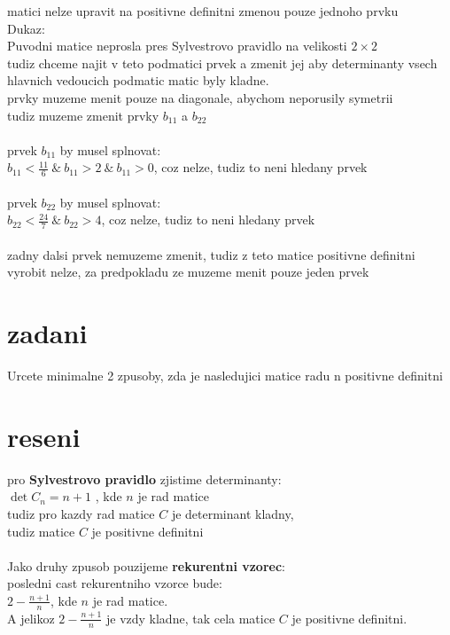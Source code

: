 \documentclass[a4paper]{article}
\begin{document}
matici nelze upravit na positivne definitni zmenou pouze jednoho prvku\\
Dukaz:\\
Puvodni matice neprosla pres Sylvestrovo pravidlo na velikosti $2\times2$\\
tudiz chceme najit v teto podmatici prvek a zmenit jej
aby determinanty vsech hlavnich vedoucich podmatic matic
byly kladne.\\
prvky muzeme menit pouze na diagonale, abychom neporusily symetrii\\
tudiz muzeme zmenit prvky $b_{11}$ a $b_{22}$\\
\\
prvek $b_{11}$ by musel splnovat:\\
$b_{11}<\frac{11}{6} ~\&~ b_{11}>2 ~\&~ b_{11}>0$, coz nelze, tudiz to neni hledany prvek\\
\\
prvek $b_{22}$ by musel splnovat:\\
$b_{22}<\frac{24}{7} ~\&~ b_{22}>4$, coz nelze, tudiz to neni hledany prvek\\
\\
zadny dalsi prvek nemuzeme zmenit, tudiz z teto matice
positivne definitni vyrobit nelze, za predpokladu ze muzeme menit pouze jeden prvek 
 









\section*{zadani}
Urcete minimalne 2 zpusoby, zda je nasledujici matice radu n
positivne definitni

\section*{reseni}
pro \textbf{Sylvestrovo pravidlo} zjistime determinanty:\\
$\det C_n = n+1$ , kde $n$ je rad matice\\
tudiz pro kazdy rad matice $C$ je determinant kladny,\\
tudiz matice $C$ je positivne definitni\\
\\
Jako druhy zpusob pouzijeme \textbf{rekurentni vzorec}:\\
posledni cast rekurentniho vzorce bude:\\
$2-\frac{n+1}{n}$, kde $n$ je rad matice.\\
A jelikoz $2-\frac{n+1}{n}$ je vzdy kladne, tak cela matice $C$ je positivne definitni.
\end{document}
